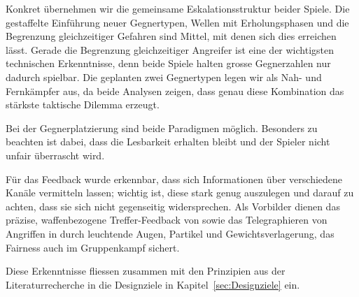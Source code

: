 \documentclass[../Main.tex]{subfiles}
\begin{document}
Konkret übernehmen wir die gemeinsame Eskalationsstruktur beider Spiele. Die gestaffelte Einführung neuer Gegnertypen, Wellen mit Erholungsphasen und die Begrenzung gleichzeitiger Gefahren sind Mittel, mit denen sich dies erreichen lässt. Gerade die Begrenzung gleichzeitiger Angreifer ist eine der wichtigsten technischen Erkenntnisse, denn beide Spiele halten grosse Gegnerzahlen nur dadurch spielbar. Die geplanten zwei Gegnertypen legen wir als Nah- und Fernkämpfer aus, da beide Analysen zeigen, dass genau diese Kombination das stärkste taktische Dilemma erzeugt.

Bei der Gegnerplatzierung sind beide Paradigmen möglich. Besonders zu beachten ist dabei, dass die Lesbarkeit erhalten bleibt und der Spieler nicht unfair überrascht wird.

Für das Feedback wurde erkennbar, dass sich Informationen über verschiedene Kanäle vermitteln lassen; wichtig ist, diese stark genug auszulegen und darauf zu achten, dass sie sich nicht gegenseitig widersprechen. Als Vorbilder dienen das präzise, waffenbezogene Treffer-Feedback von  sowie das Telegraphieren von Angriffen in  durch leuchtende Augen, Partikel und Gewichtsverlagerung, das Fairness auch im Gruppenkampf sichert.

Diese Erkenntnisse fliessen zusammen mit den Prinzipien aus der Literaturrecherche in die Designziele in Kapitel~\ref{sec:Designziele} ein.
\end{document}
